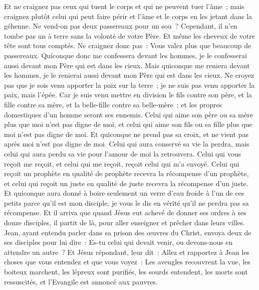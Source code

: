 \begin{multicols}{2}
Et ne craignez pas ceux qui tuent le corps et qui ne peuvent tuer l'âme~; mais craignez plutôt celui qui peut faire périr et l'âme et le corps en les jetant dans la géhenne.
Ne vend-on pas deux passereaux pour un sou~? Cependant, il n'en tombe pas un à terre sans la volonté de votre Père.
Et même les cheveux de votre tête sont tous comptés.
Ne craignez donc pas~: Vous valez plus que beaucoup de passereaux.
Quiconque donc me confessera devant les hommes, je le confesserai aussi devant mon Père qui est dans les cieux.
Mais quiconque me reniera devant les hommes, je le renierai aussi devant mon Père qui est dans les cieux.
Ne croyez pas que je sois venu apporter la paix sur la terre~; je ne suis pas venu apporter la paix, mais l'épée.
Car je suis venu mettre en division le fils contre son père, et la fille contre sa mère, et la belle-fille contre sa belle-mère~;
et les propres domestiques d'un homme seront ses ennemis.
Celui qui aime son père ou sa mère plus que moi n'est pas digne de moi, et celui qui aime son fils ou sa fille plus que moi n'est pas digne de moi.
Et quiconque ne prend pas sa croix, et ne vient pas après moi n'est pas digne de moi.
Celui qui aura conservé sa vie la perdra, mais celui qui aura perdu sa vie pour l'amour de moi la retrouvera.
Celui qui vous reçoit me reçoit, et celui qui me reçoit, reçoit celui qui m'a envoyé.
Celui qui reçoit un prophète en qualité de prophète recevra la récompense d'un prophète, et celui qui reçoit un juste en qualité de juste recevra la récompense d'un juste.
Et quiconque aura donné à boire seulement un verre d'eau froide à l'un de ces petits parce qu'il est mon disciple, je vous le dis en vérité qu'il ne perdra pas sa récompense.
\VerseOne{}Et il arriva que quand Jésus eut achevé de donner ses ordres à ses douze disciples, il partit de là, pour aller enseigner et prêcher dans leurs villes.
Jean, ayant entendu parler dans sa prison des œuvres du Christ, envoya deux de ses disciples pour lui dire~:
Es-tu celui qui devait venir, ou devons-nous en attendre un autre~?
Et Jésus répondant, leur dit~: Allez et rapportez à Jean les choses que vous entendez et que vous voyez~:
Les aveugles recouvrent la vue, les boiteux marchent, les lépreux sont purifiés, les sourds entendent, les morts sont ressuscités, et l'Evangile est annoncé aux pauvres.

\end{multicols}
